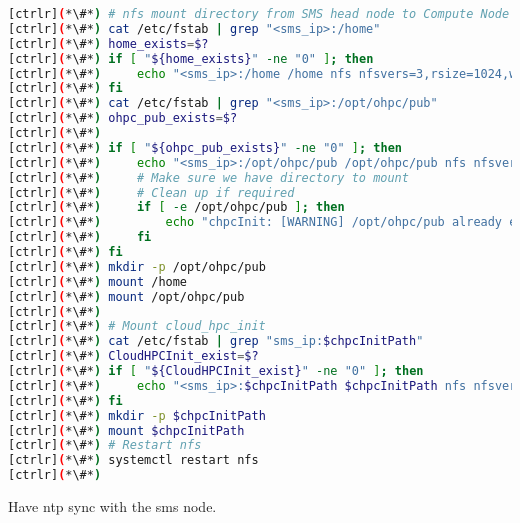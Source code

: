 \begin{lstlisting}[language=bash,keywords={}]
[ctrlr](*\#*) # nfs mount directory from SMS head node to Compute Node
[ctrlr](*\#*) cat /etc/fstab | grep "<sms_ip>:/home"
[ctrlr](*\#*) home_exists=$?
[ctrlr](*\#*) if [ "${home_exists}" -ne "0" ]; then
[ctrlr](*\#*)     echo "<sms_ip>:/home /home nfs nfsvers=3,rsize=1024,wsize=1024,cto 0 [ctrlr](*\#*) 0" >> /etc/fstab
[ctrlr](*\#*) fi
[ctrlr](*\#*) cat /etc/fstab | grep "<sms_ip>:/opt/ohpc/pub"
[ctrlr](*\#*) ohpc_pub_exists=$?
[ctrlr](*\#*) 
[ctrlr](*\#*) if [ "${ohpc_pub_exists}" -ne "0" ]; then
[ctrlr](*\#*)     echo "<sms_ip>:/opt/ohpc/pub /opt/ohpc/pub nfs nfsvers=3 0 0" >> /etc/fstab
[ctrlr](*\#*)     # Make sure we have directory to mount
[ctrlr](*\#*)     # Clean up if required
[ctrlr](*\#*)     if [ -e /opt/ohpc/pub ]; then
[ctrlr](*\#*)         echo "chpcInit: [WARNING] /opt/ohpc/pub already exists!!"
[ctrlr](*\#*)     fi
[ctrlr](*\#*) fi
[ctrlr](*\#*) mkdir -p /opt/ohpc/pub
[ctrlr](*\#*) mount /home
[ctrlr](*\#*) mount /opt/ohpc/pub
[ctrlr](*\#*) 
[ctrlr](*\#*) # Mount cloud_hpc_init
[ctrlr](*\#*) cat /etc/fstab | grep "sms_ip:$chpcInitPath"
[ctrlr](*\#*) CloudHPCInit_exist=$?
[ctrlr](*\#*) if [ "${CloudHPCInit_exist}" -ne "0" ]; then
[ctrlr](*\#*)     echo "<sms_ip>:$chpcInitPath $chpcInitPath nfs nfsvers=3 0 0" >> /etc/fstab
[ctrlr](*\#*) fi
[ctrlr](*\#*) mkdir -p $chpcInitPath
[ctrlr](*\#*) mount $chpcInitPath
[ctrlr](*\#*) # Restart nfs
[ctrlr](*\#*) systemctl restart nfs
[ctrlr](*\#*) 
\end{lstlisting}

	Have ntp sync with the sms node. 


